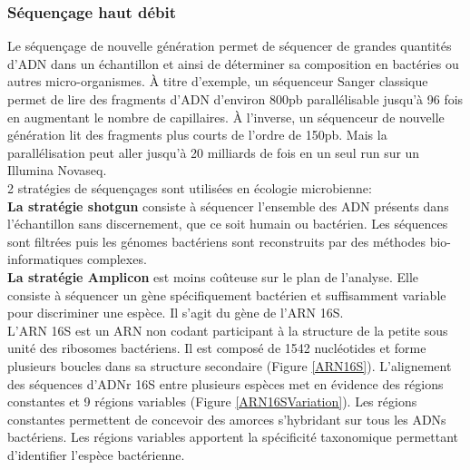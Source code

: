\documentclass[12pt,a4paper]{article}
\begin{document}
\subsubsection{Séquençage haut débit}
Le séquençage de nouvelle génération permet de séquencer de grandes quantités d'ADN dans un échantillon et ainsi de déterminer sa composition en bactéries ou autres micro-organismes. À titre d'exemple, un séquenceur Sanger classique permet de lire des fragments d'ADN d'environ 800pb parallélisable jusqu'à 96 fois en augmentant le nombre de capillaires.
À l'inverse, un séquenceur de nouvelle génération lit des fragments plus courts de l'ordre de 150pb. Mais la parallélisation peut aller jusqu'à 20 milliards de fois en un seul run sur un Illumina Novaseq. \\
2 stratégies de séquençages sont utilisées en écologie microbienne:  \\
\textbf{La stratégie shotgun} consiste à séquencer l'ensemble des  ADN présents dans l'échantillon sans discernement, que ce soit humain ou bactérien. Les séquences sont filtrées puis les génomes bactériens sont reconstruits par des méthodes bio-informatiques complexes. \\
\textbf{La stratégie Amplicon} est moins coûteuse sur le plan de l'analyse. Elle consiste à séquencer un gène spécifiquement bactérien et suffisamment variable pour discriminer une espèce. Il s'agit du gène de l'ARN 16S.\\
L'ARN 16S est un ARN non codant participant à la structure de la petite sous unité des ribosomes bactériens. Il est composé de 1542 nucléotides et forme plusieurs boucles dans sa structure secondaire (Figure \ref{ARN16S}).
L'alignement des séquences d'ADNr 16S entre plusieurs espèces met en évidence des régions constantes et 9 régions variables (Figure \ref{ARN16SVariation}). Les régions constantes permettent de concevoir des amorces s'hybridant sur tous les ADNs bactériens. Les régions variables apportent la spécificité taxonomique permettant d'identifier l'espèce bactérienne.
\end{document}

